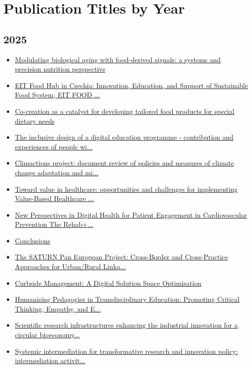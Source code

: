 \section{Publication Titles by Year}


\subsection*{2025}
\begin{itemize}[leftmargin=*, itemsep=0em, label=\textbullet]
\small
\item \href{https://doi.org/10.1038/s41514-025-00266-5}{Modulating biological aging with food-derived signals: a systems and precision nutrition perspective}
\item \href{https://doi.org/10.54779/chl20250599}{EIT Food Hub in Czechia: Innovation, Education, and Support of Sustainable Food System; EIT FOOD ...}
\item \href{https://doi.org/10.1051/bioconf/202518701001}{Co-creation as a catalyst for developing tailored food products for special dietary needs}
\item \href{https://doi.org/10.4324/9781003459651-12}{The inclusive design of a digital education programme - contribution and experiences of people wi...}
\item \href{https://doi.org/10.19191/EP25.2-3.S1.037}{Climactions project: document review of policies and measures of climate change adaptation and mi...}
\item \href{https://doi.org/10.3389/fpubh.2025.1646870}{Toward value in healthcare: opportunities and challenges for implementing Value-Based Healthcare ...}
\item \href{https://doi.org/10.4324/9781003568650-6}{New Perspectives in Digital Health for Patient Engagement in Cardiovascular Prevention The Rehab+...}
\item \href{https://doi.org/10.4324/9781003568650-13}{Conclusions}
\item \href{https://doi.org/10.4324/9781003025894-15}{The SATURN Pan European Project: Cross-Border and Cross-Practice Approaches for Urban/Rural Linka...}
\item \href{https://doi.org/10.1007/978-3-031-95284-5_46}{Curbside Management: A Digital Solution Space Optimisation}
\item \href{https://doi.org/10.1109/EDUCON62633.2025.11016618}{Humanising Pedagogies in Transdisciplinary Education: Promoting Critical Thinking, Empathy, and E...}
\item \href{https://doi.org/10.4337/9781035307968.00019}{Scientific research infrastructures enhancing the industrial innovation for a circular bioeconomy...}
\item \href{https://doi.org/10.1080/13511610.2024.2444535}{Systemic intermediation for transformative research and innovation policy: intermediation activit...}
\end{itemize}


